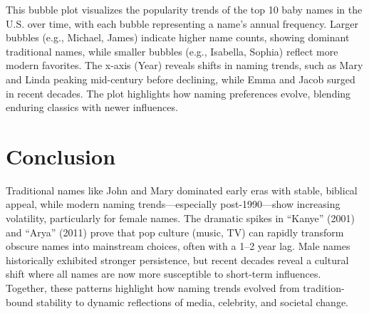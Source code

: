 \documentclass[11pt,preprint]{elsarticle}
\numberwithin{equation}{section}
\numberwithin{figure}{section}
\numberwithin{table}{section}
\begin{document}
This bubble plot visualizes the popularity trends of the top 10 baby
names in the U.S. over time, with each bubble representing a name's
annual frequency. Larger bubbles (e.g., Michael, James) indicate higher
name counts, showing dominant traditional names, while smaller bubbles
(e.g., Isabella, Sophia) reflect more modern favorites. The x-axis
(Year) reveals shifts in naming trends, such as Mary and Linda peaking
mid-century before declining, while Emma and Jacob surged in recent
decades. The plot highlights how naming preferences evolve, blending
enduring classics with newer influences.

\section{Conclusion}\label{conclusion}

Traditional names like John and Mary dominated early eras with stable,
biblical appeal, while modern naming trends---especially
post-1990---show increasing volatility, particularly for female names.
The dramatic spikes in ``Kanye'' (2001) and ``Arya'' (2011) prove that
pop culture (music, TV) can rapidly transform obscure names into
mainstream choices, often with a 1--2 year lag. Male names historically
exhibited stronger persistence, but recent decades reveal a cultural
shift where all names are now more susceptible to short-term influences.
Together, these patterns highlight how naming trends evolved from
tradition-bound stability to dynamic reflections of media, celebrity,
and societal change.


\end{document}
